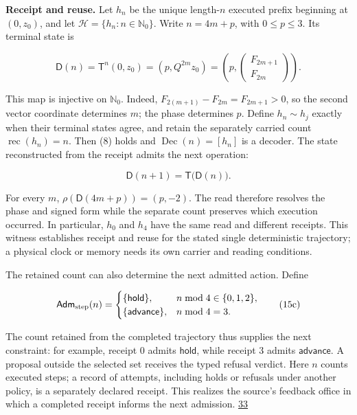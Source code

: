 \textbf{Receipt and reuse.} Let \(h_n\) be the unique length-\(n\) executed prefix beginning at \((0,z_0)\), and let \(\mathcal H=\{h_n:n\in\mathbb N_0\}\). Write \(n=4m+p\), with \(0\le p\le3\). Its terminal state is

\[
\mathsf D(n)=\mathsf T^n(0,z_0)
=\left(p,Q^{2m}z_0\right)
=\left(p,\begin{pmatrix}F_{2m+1}\\F_{2m}\end{pmatrix}\right).
\tag{15a}
\]

This map is injective on \(\mathbb N_0\). Indeed, \(F_{2(m+1)}-F_{2m}=F_{2m+1}>0\), so the second vector coordinate determines \(m\); the phase determines \(p\). Define \(h_n\sim h_j\) exactly when their terminal states agree, and retain the separately carried count \(\operatorname{rec}(h_n)=n\). Then (8) holds and \(\operatorname{Dec}(n)=[h_n]\) is a decoder. The state reconstructed from the receipt admits the next operation:

\[
\mathsf D(n+1)=\mathsf T\bigl(\mathsf D(n)\bigr).
\tag{15b}
\]

For every \(m\), \(\rho(\mathsf D(4m+p))=(p,-2)\). The read therefore resolves the phase and signed form while the separate count preserves which execution occurred. In particular, \(h_0\) and \(h_4\) have the same read and different receipts. This witness establishes receipt and reuse for the stated single deterministic trajectory; a physical clock or memory needs its own carrier and reading conditions.

The retained count can also determine the next admitted action. Define

\[
\mathsf{Adm}_{\rm step}(n)=
\begin{cases}
\{\mathsf{hold}\},&n\bmod4\in\{0,1,2\},\\
\{\mathsf{advance}\},&n\bmod4=3.
\end{cases}
\tag{15c}
\]

The count retained from the completed trajectory thus supplies the next constraint: for example, receipt \(0\) admits \(\mathsf{hold}\), while receipt \(3\) admits \(\mathsf{advance}\). A proposal outside the selected set receives the typed refusal verdict. Here \(n\) counts executed steps; a record of attempts, including holds or refusals under another policy, is a separately declared receipt. This realizes the source's feedback office in which a completed receipt informs the next admission. \href{https://chatgpt.com/library?file_id=libfile_7054d1b4713481918550a4bf9ef72320\&account_id=personal}{33}

